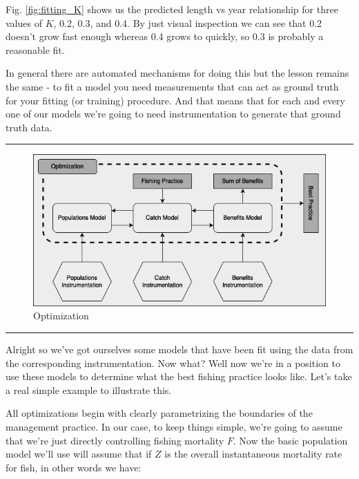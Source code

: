 \documentclass[11pt,a5paper]{book}
\begin{document}
Fig. \ref{fig:fitting_K} shows us the predicted length vs year relationship for three values of $K$, 0.2, 0.3, and 0.4. By just visual inspection we can see that 0.2 doesn't grow fast enough whereas 0.4 grows to quickly, so 0.3 is probably a reasonable fit.
\newline

In general there are automated mechanisms for doing this but the lesson remains the same - to fit a model you need measurements that can act as ground truth for your fitting (or training) procedure. And that means that for each and every one of our models we're going to need instrumentation to generate that ground truth data. 
\newpage

\noindent \rule{\textwidth}{0.5pt} 
\begin{figure}[h!] 
  \includegraphics[width=\linewidth]{drawings/high_level_optimization.png}
  \caption{Optimization}
  \label{fig:high_level_optimization}
\end{figure}
\newline
\rule{\textwidth}{0.5pt} 
\vspace{5pt}

Alright so we've got ourselves some models that have been fit using the data from the corresponding instrumentation. Now what? Well now we're in a position to use these models to determine what the best fishing practice looks like. Let's take a real simple example to illustrate this.
\newline

All optimizations begin with clearly parametrizing the boundaries of the management practice. In our case, to keep things simple, we're going to assume that we're just directly controlling fishing mortality $F$. Now the basic population model we'll use will assume that if $Z$ is the overall instantaneous mortality rate for fish, in other words we have:
\end{document}
